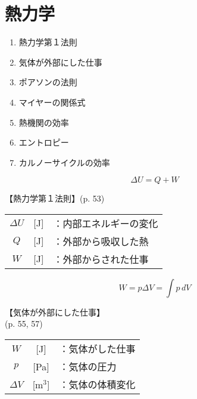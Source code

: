 \documentclass[10pt]{jarticle}
\begin{document}
\newpage
\addtocounter{page}{-1}
\thispagestyle{empty}
\section{熱力学}


\begin{enumerate}
\setcounter{enumi}{\thepage}
\small
\itemsep-4mm
\item 熱力学第１法則\\
\item 気体が外部にした仕事\\
\item ポアソンの法則\\
\item マイヤーの関係式\\
\item 熱機関の効率\\
\item エントロピー\\
\item カルノーサイクルの効率
\end{enumerate}






\newpage
\[
	\mathit{\Delta} U = Q + W
\]


\vskip3mm
【熱力学第１法則】{\footnotesize (p. 53)}

\begin{tabular}{ccl}
$\mathit{\Delta} U$	&[J]	&：{\small 内部エネルギーの変化}\\
$Q$	&[J]	&：外部から吸収した熱\\
$W$	&[J]	&：外部からされた仕事
\end{tabular}





\newpage
\[
	W =  p \mathit{\Delta}V = \int \! \! p \, dV
\]


\vskip3mm
【気体が外部にした仕事】\\
\hfill {\footnotesize (p. 55, 57)}

\begin{tabular}{ccl}
$W$	&[J]	&：{\small 気体がした仕事}\\
$p$	&[Pa]	&：気体の圧力\\
$\mathit{\Delta} V$	&[m$^3$]	&：気体の体積変化
\end{tabular}
\end{document}
